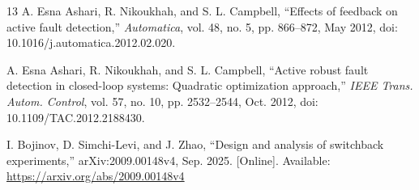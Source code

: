 \begin{thebibliography}{13}
A. Esna Ashari, R. Nikoukhah, and S. L. Campbell,
``Effects of feedback on active fault detection,'' \emph{Automatica},
vol. 48, no. 5, pp. 866--872, May 2012,
doi: 10.1016/j.automatica.2012.02.020.

A. Esna Ashari, R. Nikoukhah, and S. L. Campbell,
``Active robust fault detection in closed-loop systems: Quadratic optimization
approach,'' \emph{IEEE Trans. Autom. Control}, vol. 57, no. 10,
pp. 2532--2544, Oct. 2012, doi: 10.1109/TAC.2012.2188430.

I. Bojinov, D. Simchi-Levi, and J. Zhao,
``Design and analysis of switchback experiments,''
arXiv:2009.00148v4, Sep. 2025.
[Online]. Available: \url{https://arxiv.org/abs/2009.00148v4}

\end{thebibliography}
